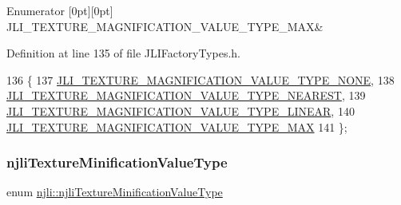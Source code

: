 \begin{DoxyEnumFields}{Enumerator}
[0pt][0pt]{}\mbox{\label{namespacenjli_a9fe7a080d946c5be3afc71d834dc7902a4165ad4c110f6ae5c1b66999c225eb86}} 
J\+L\+I\+\_\+\+T\+E\+X\+T\+U\+R\+E\+\_\+\+M\+A\+G\+N\+I\+F\+I\+C\+A\+T\+I\+O\+N\+\_\+\+V\+A\+L\+U\+E\+\_\+\+T\+Y\+P\+E\+\_\+\+M\+AX&\\
\hline

\end{DoxyEnumFields}


Definition at line 135 of file J\+L\+I\+Factory\+Types.\+h.


\begin{DoxyCode}
136   \{
137     \mbox{\hyperlink{namespacenjli_a9fe7a080d946c5be3afc71d834dc7902a9bbe31a40306010625d26211f98dbfb1}{JLI\_TEXTURE\_MAGNIFICATION\_VALUE\_TYPE\_NONE}},
138     \mbox{\hyperlink{namespacenjli_a9fe7a080d946c5be3afc71d834dc7902a644ebd1fbf4af394c0cbdb13530f2c01}{JLI\_TEXTURE\_MAGNIFICATION\_VALUE\_TYPE\_NEAREST}},
139     \mbox{\hyperlink{namespacenjli_a9fe7a080d946c5be3afc71d834dc7902a04d90ce3c66bf6b57b9cddeba4e70653}{JLI\_TEXTURE\_MAGNIFICATION\_VALUE\_TYPE\_LINEAR}},
140     \mbox{\hyperlink{namespacenjli_a9fe7a080d946c5be3afc71d834dc7902a4165ad4c110f6ae5c1b66999c225eb86}{JLI\_TEXTURE\_MAGNIFICATION\_VALUE\_TYPE\_MAX}}
141   \};
\end{DoxyCode}
\mbox{\label{namespacenjli_a980b62f11da3b7143a525012cb512bac}} 
\subsubsection{\texorpdfstring{njli\+Texture\+Minification\+Value\+Type}{njliTextureMinificationValueType}}
{\footnotesize\ttfamily enum \mbox{\hyperlink{namespacenjli_a980b62f11da3b7143a525012cb512bac}{njli\+::njli\+Texture\+Minification\+Value\+Type}}}

